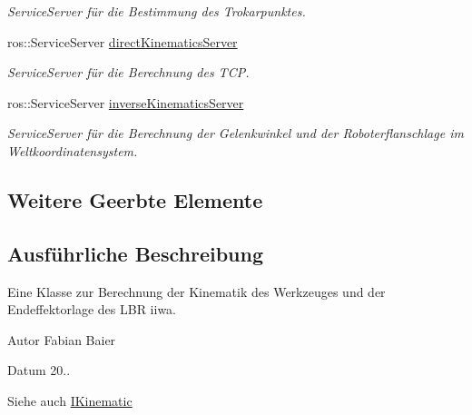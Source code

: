 \begin{DoxyCompactItemize}
\begin{DoxyCompactList}\small\item\em Service\-Server für die Bestimmung des Trokarpunktes. \end{DoxyCompactList}\item 
\hypertarget{classGeometricKinematic_a13fabf9990bdab9655b692942c9d4029}{ros\-::\-Service\-Server \hyperlink{classGeometricKinematic_a13fabf9990bdab9655b692942c9d4029}{direct\-Kinematics\-Server}}\label{classGeometricKinematic_a13fabf9990bdab9655b692942c9d4029}

\begin{DoxyCompactList}\small\item\em Service\-Server für die Berechnung des T\-C\-P. \end{DoxyCompactList}\item 
\hypertarget{classGeometricKinematic_aecb5ad028f6a1d165ece2ad904dc9b48}{ros\-::\-Service\-Server \hyperlink{classGeometricKinematic_aecb5ad028f6a1d165ece2ad904dc9b48}{inverse\-Kinematics\-Server}}\label{classGeometricKinematic_aecb5ad028f6a1d165ece2ad904dc9b48}

\begin{DoxyCompactList}\small\item\em Service\-Server für die Berechnung der Gelenkwinkel und der Roboterflanschlage im Weltkoordinatensystem. \end{DoxyCompactList}\end{DoxyCompactItemize}
\subsection*{Weitere Geerbte Elemente}


\subsection{Ausführliche Beschreibung}
Eine Klasse zur Berechnung der Kinematik des Werkzeuges und der Endeffektorlage des L\-B\-R iiwa. 

\begin{DoxyAuthor}{Autor}
Fabian Baier 
\end{DoxyAuthor}
\begin{DoxyDate}{Datum}
20.. 
\end{DoxyDate}
\begin{DoxySeeAlso}{Siehe auch}
\hyperlink{classIKinematic}{I\-Kinematic} 
\end{DoxySeeAlso}


